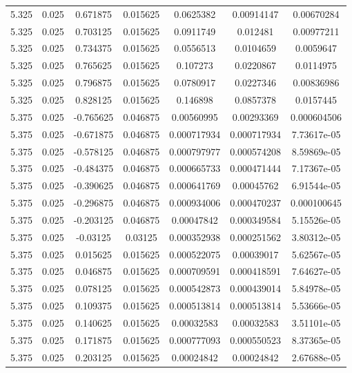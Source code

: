 \begin{table}[bh]
\begin{center}
{\begin{tabular}{ccccccc}
5.325	 & 0.025 & 	0.671875	 & 0.015625	 & 0.0625382	 & 0.00914147	 & 0.00670284 \\ 
5.325	 & 0.025 & 	0.703125	 & 0.015625	 & 0.0911749	 & 0.012481	 & 0.00977211 \\ 
5.325	 & 0.025 & 	0.734375	 & 0.015625	 & 0.0556513	 & 0.0104659	 & 0.0059647 \\ 
5.325	 & 0.025 & 	0.765625	 & 0.015625	 & 0.107273	 & 0.0220867	 & 0.0114975 \\ 
5.325	 & 0.025 & 	0.796875	 & 0.015625	 & 0.0780917	 & 0.0227346	 & 0.00836986 \\ 
5.325	 & 0.025 & 	0.828125	 & 0.015625	 & 0.146898	 & 0.0857378	 & 0.0157445 \\ 
5.375	 & 0.025 & 	-0.765625	 & 0.046875	 & 0.00560995	 & 0.00293369	 & 0.000604506 \\ 
5.375	 & 0.025 & 	-0.671875	 & 0.046875	 & 0.000717934	 & 0.000717934	 & 7.73617e-05 \\ 
5.375	 & 0.025 & 	-0.578125	 & 0.046875	 & 0.000797977	 & 0.000574208	 & 8.59869e-05 \\ 
5.375	 & 0.025 & 	-0.484375	 & 0.046875	 & 0.000665733	 & 0.000471444	 & 7.17367e-05 \\ 
5.375	 & 0.025 & 	-0.390625	 & 0.046875	 & 0.000641769	 & 0.00045762	 & 6.91544e-05 \\ 
5.375	 & 0.025 & 	-0.296875	 & 0.046875	 & 0.000934006	 & 0.000470237	 & 0.000100645 \\ 
5.375	 & 0.025 & 	-0.203125	 & 0.046875	 & 0.00047842	 & 0.000349584	 & 5.15526e-05 \\ 
5.375	 & 0.025 & 	-0.03125	 & 0.03125	 & 0.000352938	 & 0.000251562	 & 3.80312e-05 \\ 
5.375	 & 0.025 & 	0.015625	 & 0.015625	 & 0.000522075	 & 0.00039017	 & 5.62567e-05 \\ 
5.375	 & 0.025 & 	0.046875	 & 0.015625	 & 0.000709591	 & 0.000418591	 & 7.64627e-05 \\ 
5.375	 & 0.025 & 	0.078125	 & 0.015625	 & 0.000542873	 & 0.000439014	 & 5.84978e-05 \\ 
5.375	 & 0.025 & 	0.109375	 & 0.015625	 & 0.000513814	 & 0.000513814	 & 5.53666e-05 \\ 
5.375	 & 0.025 & 	0.140625	 & 0.015625	 & 0.00032583	 & 0.00032583	 & 3.51101e-05 \\ 
5.375	 & 0.025 & 	0.171875	 & 0.015625	 & 0.000777093	 & 0.000550523	 & 8.37365e-05 \\ 
5.375	 & 0.025 & 	0.203125	 & 0.015625	 & 0.00024842	 & 0.00024842	 & 2.67688e-05 \\ 

\end{tabular}}
\end{center}
\end{table}

